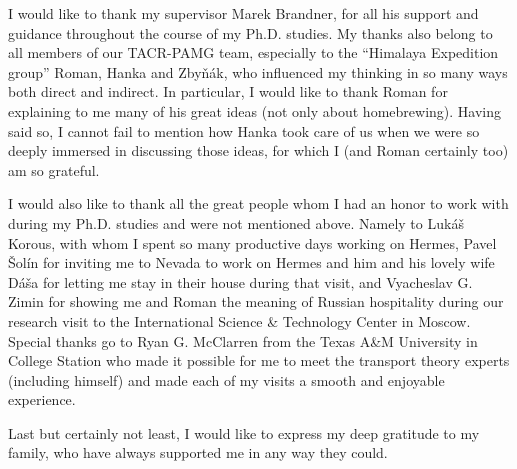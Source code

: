 

\begin{acknowledgements}      %

I would like to thank my supervisor Marek Brandner, for all his support and guidance throughout the course of 
my Ph.D. studies. My thanks also belong to all members of our TACR-PAMG team, especially to the ``Himalaya
Expedition group'' Roman, Hanka and Zby{\v n}{\' a}k, who influenced my thinking in so many ways both direct and
indirect. In particular, I would like to thank Roman for explaining to me many of his great ideas (not only about
homebrewing). Having said so, I cannot fail to mention how Hanka took care of us when we were so deeply immersed in discussing those ideas, for which I (and Roman certainly too)
am so grateful.

I would also like to thank all the great people whom I had an honor to work with during my Ph.D. studies and were
not mentioned above. Namely to Luk{\' a}{\v s} Korous, with whom I spent so many productive days working on Hermes,
Pavel {\v S}ol{\' i}n for inviting me to Nevada to work on Hermes and him and his lovely wife D{\' a}{\v s}a for
letting me stay in their house during that visit, and Vyacheslav G. Zimin for
showing me and Roman the meaning of Russian hospitality during our research visit to the International Science \&
Technology Center in Moscow. Special thanks go to Ryan G. McClarren from the Texas A\&M University in College Station who made it
possible for me to meet the transport theory experts (including himself) and made each of my visits a smooth and
enjoyable experience.

Last but certainly not least, I would like to express my deep gratitude to my family, who have always supported me in
any way they could.

\end{acknowledgements}



